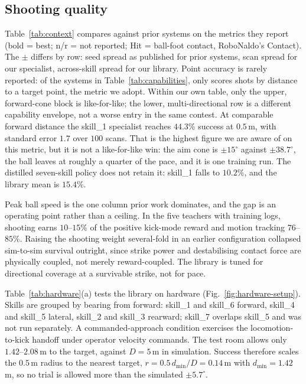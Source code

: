 \documentclass[letterpaper, 10 pt, conference]{ieeeconf}  %
\begin{document}
\subsection{Shooting quality}
\label{sec:hardware}

Table~\ref{tab:context} compares against prior systems on the metrics they
report (bold = best; n/r = not reported; Hit = ball-foot contact, RoboNaldo's
Contact). The $\pm$ differs by row: seed spread as published for prior
systems, scan spread for our specialist, across-skill spread for our library.
Point accuracy is rarely reported: of the systems in
Table~\ref{tab:capabilities}, only \cite{robonaldo} scores shots by distance
to a target point, the metric we adopt. Within our own table, only the upper, forward-cone
block is like-for-like; the lower, multi-directional row is a different
capability envelope, not a worse entry in the same contest. At comparable
forward distance the skill\_1 specialist reaches $44.3\%$ success at
$0.5$\,m, with standard error $1.7$ over $100$ scans. That is the highest figure we
are aware of on this metric, but it is not a like-for-like win: the aim cone
is $\pm15^\circ$ against $\pm38.7^\circ$, the ball leaves at roughly a
quarter of the pace, and it is one training run. The distilled seven-skill
policy does not retain it: skill\_1 falls to $10.2\%$, and the library mean is
$15.4\%$.

Peak ball speed is the one column prior work dominates, and the gap is an
operating point rather than a ceiling. In the five teachers with training logs,
shooting earns $10$--$15\%$ of the positive kick-mode reward and motion
tracking $76$--$85\%$. Raising the shooting weight several-fold in an
earlier configuration collapsed sim-to-sim survival outright, since strike
power and destabilising contact force are physically coupled, not merely
reward-coupled. The library is tuned for directional
coverage at a survivable strike, not for pace.

Table~\ref{tab:hardware}(a) tests the library on hardware
(Fig.~\ref{fig:hardware-setup}). Skills are grouped by bearing from forward:
skill\_1 and skill\_6 forward, skill\_4 and skill\_5 lateral, skill\_2 and
skill\_3 rearward; skill\_7 overlaps skill\_5 and was not run separately. A
commanded-approach condition exercises the locomotion-to-kick handoff under
operator velocity commands. The test room allows only $1.42$--$2.08$\,m to
the target, against $D{=}5$\,m in simulation. Success therefore scales the
$0.5$\,m radius to the nearest target, $r=0.5\,d_{\min}/D=0.14$\,m with
$d_{\min}=1.42$\,m, so no trial is allowed more than the simulated
$\pm5.7^\circ$.
\end{document}
